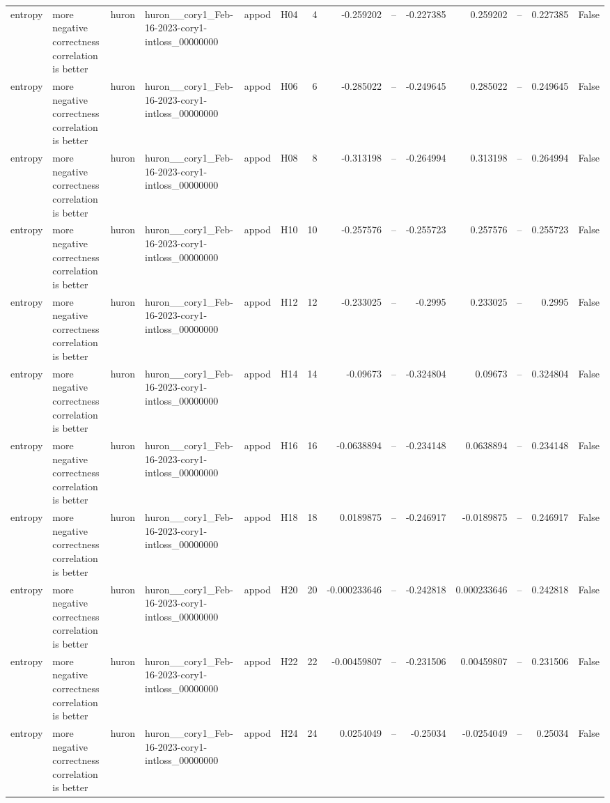 \begin{longtable}{llllllrrrrrrrr}
entropy & more negative correctness correlation is better & huron & huron\_\_cory1\_Feb-16-2023-cory1-intloss\_00000000 & appod & H04 & 4 & -0.259202 & -- & -0.227385 & 0.259202 & -- & 0.227385 & False \\
entropy & more negative correctness correlation is better & huron & huron\_\_cory1\_Feb-16-2023-cory1-intloss\_00000000 & appod & H06 & 6 & -0.285022 & -- & -0.249645 & 0.285022 & -- & 0.249645 & False \\
entropy & more negative correctness correlation is better & huron & huron\_\_cory1\_Feb-16-2023-cory1-intloss\_00000000 & appod & H08 & 8 & -0.313198 & -- & -0.264994 & 0.313198 & -- & 0.264994 & False \\
entropy & more negative correctness correlation is better & huron & huron\_\_cory1\_Feb-16-2023-cory1-intloss\_00000000 & appod & H10 & 10 & -0.257576 & -- & -0.255723 & 0.257576 & -- & 0.255723 & False \\
entropy & more negative correctness correlation is better & huron & huron\_\_cory1\_Feb-16-2023-cory1-intloss\_00000000 & appod & H12 & 12 & -0.233025 & -- & -0.2995 & 0.233025 & -- & 0.2995 & False \\
entropy & more negative correctness correlation is better & huron & huron\_\_cory1\_Feb-16-2023-cory1-intloss\_00000000 & appod & H14 & 14 & -0.09673 & -- & -0.324804 & 0.09673 & -- & 0.324804 & False \\
entropy & more negative correctness correlation is better & huron & huron\_\_cory1\_Feb-16-2023-cory1-intloss\_00000000 & appod & H16 & 16 & -0.0638894 & -- & -0.234148 & 0.0638894 & -- & 0.234148 & False \\
entropy & more negative correctness correlation is better & huron & huron\_\_cory1\_Feb-16-2023-cory1-intloss\_00000000 & appod & H18 & 18 & 0.0189875 & -- & -0.246917 & -0.0189875 & -- & 0.246917 & False \\
entropy & more negative correctness correlation is better & huron & huron\_\_cory1\_Feb-16-2023-cory1-intloss\_00000000 & appod & H20 & 20 & -0.000233646 & -- & -0.242818 & 0.000233646 & -- & 0.242818 & False \\
entropy & more negative correctness correlation is better & huron & huron\_\_cory1\_Feb-16-2023-cory1-intloss\_00000000 & appod & H22 & 22 & -0.00459807 & -- & -0.231506 & 0.00459807 & -- & 0.231506 & False \\
entropy & more negative correctness correlation is better & huron & huron\_\_cory1\_Feb-16-2023-cory1-intloss\_00000000 & appod & H24 & 24 & 0.0254049 & -- & -0.25034 & -0.0254049 & -- & 0.25034 & False \\

\end{longtable}
